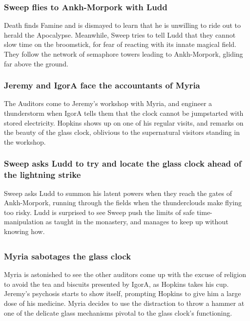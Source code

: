 \subsubsection{\Gls{Sweep} flies to Ankh-Morpork with \Gls{Ludd}}
\Gls{Death} finds \Gls{Famine} and is dismayed to learn that he is unwilling to ride out to herald
the Apocalypse. Meanwhile, \Gls{Sweep} tries to tell \Gls{Ludd} that they cannot slow time on the
broomstick, for fear of reacting with its innate magical field. They follow the network of
semaphore towers leading to Ankh-Morpork, gliding far above the ground.

\subsubsection{\Gls{Jeremy} and \Gls{IgorA} face the accountants of \Gls{Myria}}
The Auditors come to \Gls{Jeremy}'s workshop with \Gls{Myria}, and engineer a thunderstorm when
\Gls{IgorA} tells them that the clock cannot be jumpstarted with stored electricity. \Gls{Hopkins}
shows up on one of his regular visits, and remarks on the beauty of the glass clock, oblivious to
the supernatural visitors standing in the workshop.

\subsubsection{\Gls{Sweep} asks \Gls{Ludd} to try and locate the glass clock ahead of the lightning
    strike}
\Gls{Sweep} asks \Gls{Ludd} to summon his latent powers when they reach the gates of Ankh-Morpork,
running through the fields when the thunderclouds make flying too risky. \Gls{Ludd} is surprised to
see \Gls{Sweep} push the limits of safe time-manipulation as taught in the monastery, and manages
to keep up without knowing how.

\subsection{}
\subsubsection{\Gls{Myria} sabotages the glass clock}
\Gls{Myria} is astonished to see the other auditors come up with the excuse of religion to avoid
the tea and biscuits presented by \Gls{IgorA}, as \Gls{Hopkins} takes his cup. \Gls{Jeremy}'s
psychosis starts to show itself, prompting \Gls{Hopkins} to give him a large dose of his medicine.
\Gls{Myria} decides to use the distraction to throw a hammer at one of the delicate glass mechanisms
pivotal to the glass clock's functioning.

